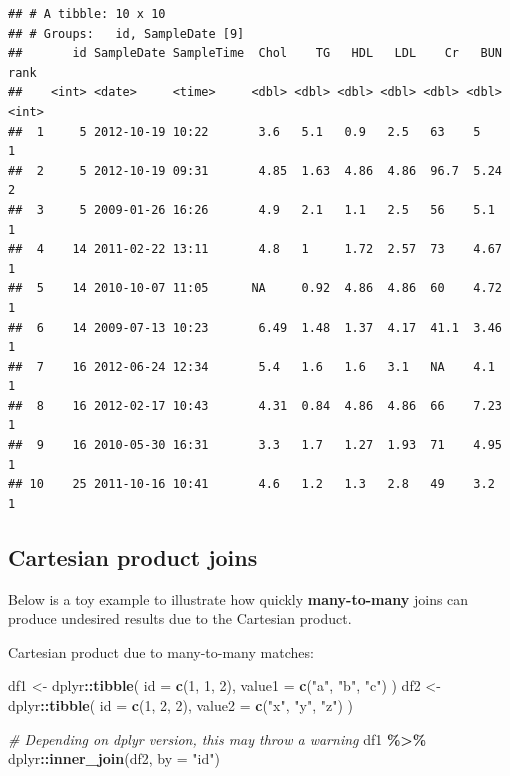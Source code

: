 \documentclass[
]{book}
\newenvironment{Shaded}{\begin{snugshade}}{\end{snugshade}}
\newcommand{\AttributeTok}[1]{\textcolor[rgb]{0.13,0.29,0.53}{#1}}
\newcommand{\CommentTok}[1]{\textcolor[rgb]{0.56,0.35,0.01}{\textit{#1}}}
\newcommand{\DecValTok}[1]{\textcolor[rgb]{0.00,0.00,0.81}{#1}}
\newcommand{\FunctionTok}[1]{\textcolor[rgb]{0.13,0.29,0.53}{\textbf{#1}}}
\newcommand{\NormalTok}[1]{#1}
\newcommand{\OtherTok}[1]{\textcolor[rgb]{0.56,0.35,0.01}{#1}}
\newcommand{\SpecialCharTok}[1]{\textcolor[rgb]{0.81,0.36,0.00}{\textbf{#1}}}
\newcommand{\StringTok}[1]{\textcolor[rgb]{0.31,0.60,0.02}{#1}}
\begin{document}
\begin{verbatim}
## # A tibble: 10 x 10
## # Groups:   id, SampleDate [9]
##       id SampleDate SampleTime  Chol    TG   HDL   LDL    Cr   BUN  rank
##    <int> <date>     <time>     <dbl> <dbl> <dbl> <dbl> <dbl> <dbl> <int>
##  1     5 2012-10-19 10:22       3.6   5.1   0.9   2.5   63    5        1
##  2     5 2012-10-19 09:31       4.85  1.63  4.86  4.86  96.7  5.24     2
##  3     5 2009-01-26 16:26       4.9   2.1   1.1   2.5   56    5.1      1
##  4    14 2011-02-22 13:11       4.8   1     1.72  2.57  73    4.67     1
##  5    14 2010-10-07 11:05      NA     0.92  4.86  4.86  60    4.72     1
##  6    14 2009-07-13 10:23       6.49  1.48  1.37  4.17  41.1  3.46     1
##  7    16 2012-06-24 12:34       5.4   1.6   1.6   3.1   NA    4.1      1
##  8    16 2012-02-17 10:43       4.31  0.84  4.86  4.86  66    7.23     1
##  9    16 2010-05-30 16:31       3.3   1.7   1.27  1.93  71    4.95     1
## 10    25 2011-10-16 10:41       4.6   1.2   1.3   2.8   49    3.2      1
\end{verbatim}

\subsection{Cartesian product joins}\label{sec:CartesianProduct}

Below is a toy example to illustrate how quickly \textbf{many-to-many} joins can produce undesired results due to the Cartesian product.

Cartesian product due to many-to-many matches:

\begin{Shaded}
\begin{Highlighting}[]
\NormalTok{df1 }\OtherTok{\textless{}{-}}\NormalTok{ dplyr}\SpecialCharTok{::}\FunctionTok{tibble}\NormalTok{(}
        \AttributeTok{id =} \FunctionTok{c}\NormalTok{(}\DecValTok{1}\NormalTok{, }\DecValTok{1}\NormalTok{, }\DecValTok{2}\NormalTok{), }
        \AttributeTok{value1 =} \FunctionTok{c}\NormalTok{(}\StringTok{"a"}\NormalTok{, }\StringTok{"b"}\NormalTok{, }\StringTok{"c"}\NormalTok{)}
\NormalTok{        )}
\NormalTok{df2 }\OtherTok{\textless{}{-}}\NormalTok{ dplyr}\SpecialCharTok{::}\FunctionTok{tibble}\NormalTok{(}
        \AttributeTok{id =} \FunctionTok{c}\NormalTok{(}\DecValTok{1}\NormalTok{, }\DecValTok{2}\NormalTok{, }\DecValTok{2}\NormalTok{),}
        \AttributeTok{value2 =} \FunctionTok{c}\NormalTok{(}\StringTok{"x"}\NormalTok{, }\StringTok{"y"}\NormalTok{, }\StringTok{"z"}\NormalTok{)}
\NormalTok{        )}

\CommentTok{\# Depending on dplyr version, this may throw a warning}
\NormalTok{df1 }\SpecialCharTok{\%\textgreater{}\%}\NormalTok{ dplyr}\SpecialCharTok{::}\FunctionTok{inner\_join}\NormalTok{(df2, }\AttributeTok{by =} \StringTok{"id"}\NormalTok{)}
\end{Highlighting}
\end{Shaded}
\end{document}
